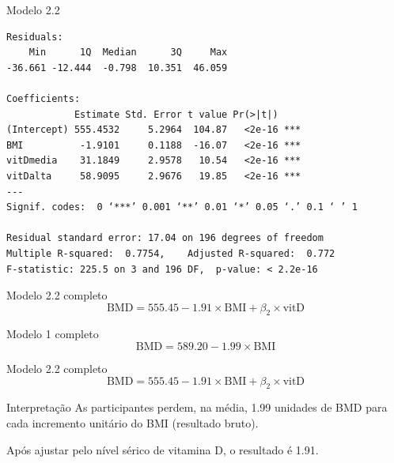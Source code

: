 \documentclass{beamer}
\begin{document}
\begin{frame}[fragile]{\scriptsize }
  \begin{center}
    \begin{exampleblock}{Modelo 2.2}
      \tiny
\begin{verbatim}
Residuals:
    Min      1Q  Median      3Q     Max 
-36.661 -12.444  -0.798  10.351  46.059 

Coefficients:
            Estimate Std. Error t value Pr(>|t|)    
(Intercept) 555.4532     5.2964  104.87   <2e-16 ***
BMI          -1.9101     0.1188  -16.07   <2e-16 ***
vitDmedia    31.1849     2.9578   10.54   <2e-16 ***
vitDalta     58.9095     2.9676   19.85   <2e-16 ***
---
Signif. codes:  0 ‘***’ 0.001 ‘**’ 0.01 ‘*’ 0.05 ‘.’ 0.1 ‘ ’ 1

Residual standard error: 17.04 on 196 degrees of freedom
Multiple R-squared:  0.7754,	Adjusted R-squared:  0.772 
F-statistic: 225.5 on 3 and 196 DF,  p-value: < 2.2e-16
\end{verbatim}
    \end{exampleblock}
  \begin{exampleblock}{Modelo 2.2 completo}
    \scriptsize
    \begin{displaymath}
      \text{BMD} =555.45 -1.91 \times\text{BMI} + \beta_2 \times\text{vitD}
    \end{displaymath}
  \end{exampleblock}
  \end{center}
\end{frame}

\begin{frame}{\scriptsize }
  \begin{exampleblock}{Modelo 1 completo}
    \tiny
    \begin{displaymath}
      \text{BMD} =589.20 -1.99 \times\text{BMI}
    \end{displaymath}
  \end{exampleblock}
  \begin{exampleblock}{Modelo 2.2 completo}
    \scriptsize
    \begin{displaymath}
      \text{BMD} =555.45 -1.91 \times\text{BMI} + \beta_2 \times\text{vitD}
    \end{displaymath}
  \end{exampleblock}
  \begin{exampleblock}{Interpretação}
    \footnotesize
    As participantes perdem, na média, 1.99 unidades de BMD para cada incremento unitário do BMI (resultado bruto).

    \bigskip
    Após ajustar pelo nível sérico de vitamina D, o resultado é 1.91.
  \end{exampleblock}
\end{frame}
\end{document}
